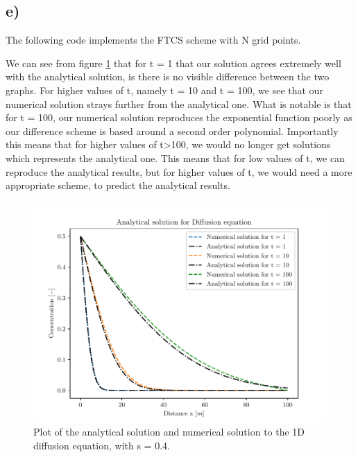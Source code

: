 \documentclass[10pt, a4paper]{amsart}
\begin{document}
\subsection{e)}
The following code implements the FTCS scheme with N grid points. 

We can see from figure \ref{fig:diff} that for t = 1 that our solution agrees extremely well with the analytical solution, is there is no visible difference between the two graphs. For higher values of t, namely t = 10 and t = 100, we see that our numerical solution strays further from the analytical one. What is notable is that for t = 100, our numerical solution reproduces the exponential function poorly as our difference scheme is based around a second order polynomial. Importantly this means that for higher values of t>100, we would no longer get solutions which represents the analytical one. This means that for low values of t, we can reproduce the analytical results, but for higher values of t, we would need a more appropriate scheme, to predict the analytical results. 
\begin{figure}[h]
	\centering
	\includegraphics[width=0.9\linewidth]{"../code/NUMFTCS.pdf"}
	\caption{Plot of the analytical solution and numerical solution to the 1D diffusion equation, with s = 0.4.}
	\label{fig:diff}
\end{figure}
\end{document}
